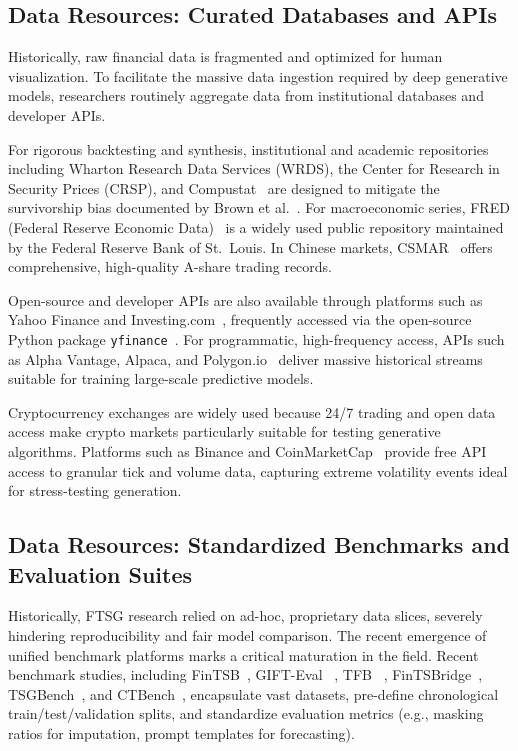 \documentclass[11pt,a4paper]{article}
\providecommand{\DIFaddbegin}{} %
\providecommand{\DIFaddend}{} %
\providecommand{\DIFdelbegin}{} %
\providecommand{\DIFdelend}{} %
\providecommand{\DIFscaledelfig}{0.5}
\newlength{\DIFdelgraphicswidth} %
\newlength{\DIFdelgraphicsheight} %
\providecommand{\DIFaddincludegraphics}[2][]{{\color{blue}\fbox{\DIFOincludegraphics[#1]{#2}}}} %
\providecommand{\DIFdelincludegraphics}[2][]{%
\sbox{\DIFdelgraphicsbox}{\DIFOincludegraphics[#1]{#2}}%
\settoboxwidth{\DIFdelgraphicswidth}{\DIFdelgraphicsbox} %
\settoboxtotalheight{\DIFdelgraphicsheight}{\DIFdelgraphicsbox} %
\scalebox{\DIFscaledelfig}{%
\parbox[b]{\DIFdelgraphicswidth}{\usebox{\DIFdelgraphicsbox}\\[-\baselineskip] \rule{\DIFdelgraphicswidth}{0em}}\llap{\resizebox{\DIFdelgraphicswidth}{\DIFdelgraphicsheight}{%
\setlength{\unitlength}{\DIFdelgraphicswidth}%
\begin{picture}(1,1)%
\thicklines\linethickness{2pt} %
{\color[rgb]{1,0,0}\put(0,0){\framebox(1,1){}}}%
{\color[rgb]{1,0,0}\put(0,0){\line( 1,1){1}}}%
{\color[rgb]{1,0,0}\put(0,1){\line(1,-1){1}}}%
\end{picture}%
}\hspace*{3pt}}} %
} %
\DeclareRobustCommand{\DIFaddbegin}{\DIFOaddbegin \let\includegraphics\DIFaddincludegraphics} %
\DeclareRobustCommand{\DIFaddend}{\DIFOaddend \let\includegraphics\DIFOincludegraphics} %
\DeclareRobustCommand{\DIFdelbegin}{\DIFOdelbegin \let\includegraphics\DIFdelincludegraphics} %
\DeclareRobustCommand{\DIFdelend}{\DIFOaddend \let\includegraphics\DIFOincludegraphics} %
\begin{document}
\subsection{Data Resources: Curated Databases and APIs}
Historically, raw financial data is fragmented and optimized for human visualization. To facilitate the massive data ingestion required by deep generative models, researchers routinely aggregate data from institutional databases and developer APIs.

For rigorous backtesting and synthesis, institutional and academic repositories including Wharton Research Data Services (WRDS), the Center for Research in Security Prices (CRSP), and Compustat~\citep{wrds,crsp,compustat} are designed to mitigate the survivorship bias documented by Brown et al.~\citep{brown1992survivorship}. For macroeconomic series, FRED (Federal Reserve Economic Data)~\citep{fred} is a widely used public repository maintained by the Federal Reserve Bank of St.~Louis. In Chinese markets, CSMAR~\citep{csmar} offers comprehensive, high-quality A-share trading records.

Open-source and developer APIs are also available through platforms such as Yahoo Finance and Investing.com~\citep{yahoofinance,investingcom}, frequently accessed via the open-source Python package \texttt{yfinance}~\citep{yfinance}. For programmatic, high-frequency access, APIs such as Alpha Vantage, Alpaca, and Polygon.io~\citep{alphavantage,alpaca,polygon} deliver massive historical streams suitable for training large-scale predictive models.

Cryptocurrency exchanges are widely used because 24/7 trading and open data access make crypto markets particularly suitable for testing generative algorithms. Platforms such as Binance and CoinMarketCap~\citep{binance,coinmarketcap} provide free API access to granular tick and volume data, capturing extreme volatility events ideal for stress-testing generation.

\subsection{Data Resources: Standardized Benchmarks and Evaluation Suites}
Historically, FTSG research relied on ad-hoc, proprietary data slices, severely hindering reproducibility and fair model comparison. The recent emergence of unified benchmark platforms marks a critical maturation in the field. Recent benchmark studies, including FinTSB~\citep{hu2025fintsb}, GIFT-Eval~\DIFdelbegin %
\DIFdelend \DIFaddbegin \citep{GIFT-Eval}\DIFaddend , TFB~\DIFdelbegin %
\DIFdelend \DIFaddbegin \citep{TFB}\DIFaddend , FinTSBridge~\citep{wang2025fintsbridge}, TSGBench~\citep{ang2023tsgbench}, and CTBench~\citep{ang2025ctbench}, encapsulate vast datasets, pre-define chronological train/test/validation splits, and standardize evaluation metrics (e.g., masking ratios for imputation, prompt templates for forecasting).
\end{document}
